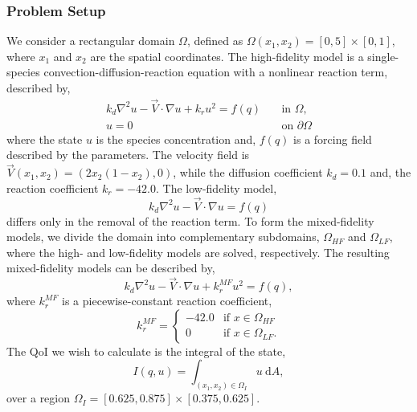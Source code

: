 \subsubsection{Problem Setup} \label{sec:cdvcdrSetup}
%
We consider a rectangular domain $\Omega$, defined as $\Omega(x_1,x_2)=[0,5]\times[0,1]$, where $x_1$ and $x_2$ are the spatial coordinates. The high-fidelity model is a single-species convection-diffusion-reaction equation with a nonlinear reaction term, described by,
%
\begin{subequations}
\label{eq:cdvcdrHF}
\begin{align}
k_d\nabla^2 u - \vec{V}\cdot\nabla u + k_ru^2 = f(q) \quad &\text{in } \Omega, \label{eq:cdvcdrHF_int} \\
u = 0 \quad &\text{on } \partial \Omega \label{eq:cdvcdrHF_bdry}
\end{align} 
\end{subequations}
%
where the state $u$ is the species concentration and, $f(q)$ is a forcing field described by the parameters. The velocity field is $\vec{V}(x_1,x_2) = (2x_2(1-x_2),0)$, while the diffusion coefficient $k_d = 0.1$ and, the reaction coefficient $k_r = -42.0$. The low-fidelity model,
%
\begin{equation}
k_d\nabla^2 u - \vec{V}\cdot\nabla u = f(q)
\end{equation}
%
differs only in the removal of the reaction term. To form the mixed-fidelity models, we divide the domain into complementary subdomains, $\Omega_{HF}$ and $\Omega_{LF}$, where the high- and low-fidelity models are solved, respectively. The resulting mixed-fidelity models can be described by, 
%
\begin{equation}
k_d\nabla^2 u - \vec{V}\cdot\nabla u + k^{MF}_ru^2= f(q),
\end{equation}
%
where $k^{MF}_r$ is a piecewise-constant reaction coefficient,
%
\begin{equation}
k^{MF}_r=
\begin{cases}
-42.0 & \textrm{if }x\in\Omega_{HF} \\
0 & \textrm{if }x\in\Omega_{LF}.
\end{cases}
\end{equation}
%
The QoI we wish to calculate is the integral of the state,
%
\begin{equation}
I(q,u)=\int_{(x_1,x_2)\in \Omega_I} u \:\textrm{d}A,
\end{equation}
%
over a region $\Omega_I=[0.625,0.875]\times[0.375,0.625]$. 


